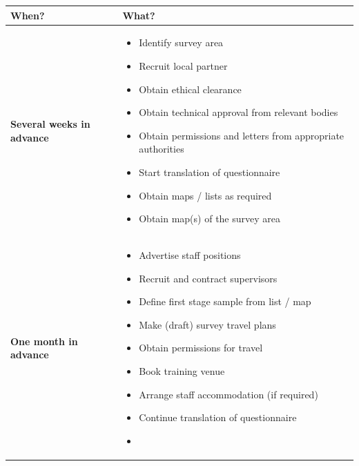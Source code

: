 \documentclass[12pt,a4paper]{book}
\providecommand{\tightlist}{%
  \setlength{\itemsep}{0pt}\setlength{\parskip}{0pt}}
\theoremstyle{definition}
\theoremstyle{definition}
\theoremstyle{definition}
\theoremstyle{remark}
\begin{document}
\begin{longtable}[]{@{}ll@{}}
\toprule
\begin{minipage}[b]{0.25\columnwidth}\raggedright
\textbf{When?}\strut
\end{minipage} & \begin{minipage}[b]{0.70\columnwidth}\raggedright
\textbf{What?}\strut
\end{minipage}\tabularnewline
\midrule
\endhead
\begin{minipage}[t]{0.48\columnwidth}\raggedright
\textbf{Several weeks in advance}\strut
\end{minipage} & \begin{minipage}[t]{0.48\columnwidth}\raggedright
\begin{itemize}
\tightlist
\item
  Identify survey area
\item
  Recruit local partner
\item
  Obtain ethical clearance
\item
  Obtain technical approval from relevant bodies
\item
  Obtain permissions and letters from appropriate authorities
\item
  Start translation of questionnaire
\item
  Obtain maps / lists as required
\item
  Obtain map(s) of the survey area
\end{itemize}\strut
\end{minipage}\tabularnewline
\begin{minipage}[t]{0.48\columnwidth}\raggedright
\textbf{One month in advance}\strut
\end{minipage} & \begin{minipage}[t]{0.48\columnwidth}\raggedright
\begin{itemize}
\tightlist
\item
  Advertise staff positions
\item
  Recruit and contract supervisors
\item
  Define first stage sample from list / map
\item
  Make (draft) survey travel plans
\item
  Obtain permissions for travel
\item
  Book training venue
\item
  Arrange staff accommodation (if required)
\item
  Continue translation of questionnaire
\item

\end{itemize}
\end{minipage}
\end{longtable}
\end{document}
